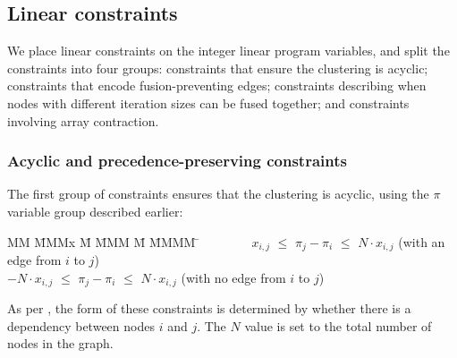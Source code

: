 \subsection{Linear constraints}
\label{clustering:s:LinearConstraints}
We place linear constraints on the integer linear program variables, and split the constraints into four groups: constraints that ensure the clustering is acyclic; constraints that encode fusion-preventing edges; constraints describing when nodes with different iteration sizes can be fused together; and constraints involving array contraction. 



\subsubsection{Acyclic and precedence-preserving constraints}

The first group of constraints ensures that the clustering is acyclic, using the $\pi$ variable group described earlier:
\begin{tabbing}
MM  \= MMMx \= M \= MMM \= M \= MMMM \= \kill
    \> ~~~~~~~ $x_{i,j}$ \> $\le$ \> $\pi_j - \pi_i$ \> $\le$ \> $N \cdot x_{i,j}$ 
    \>             (with an edge from $i$ to $j$)            \\
    \> $-N \cdot  x_{i,j}$  \> $\le$ \> $\pi_j - \pi_i$ \> $\le$ \> $N \cdot x_{i,j}$ 
    \>             (with no edge from $i$ to $j$)
\end{tabbing}

As per \citet{megiddo1998optimal}, the form of these constraints is determined by whether there is a dependency between nodes $i$ and $j$.
The $N$ value is set to the total number of nodes in the graph.

